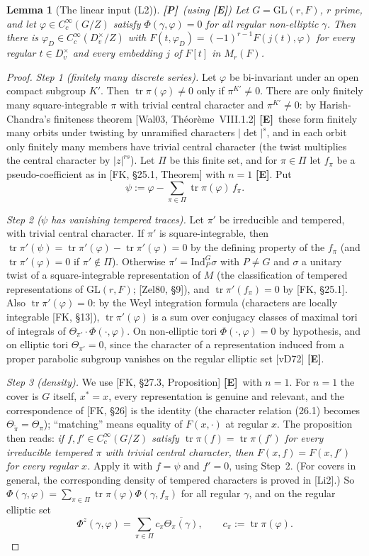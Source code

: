 \documentclass[12pt]{article}
\newcommand{\ov}[1]{\overline{#1}}
\newcommand{\tr}{\operatorname{tr}}
\newcommand{\GL}{\mathrm{GL}}
\newcommand{\Pv}{\textbf{[P]}}
\newcommand{\Ev}{\textbf{[E]}}
\theoremstyle{plain}
\newtheorem{lemma}[theorem]{Lemma}
\theoremstyle{definition}
\begin{document}
\begin{lemma}[The linear input (L2)]\label{lem:L2}\Pv\ (using \Ev)
Let $G=\GL(r,F)$, $r$ prime, and let $\varphi\in C_c^\infty(G/Z)$ satisfy $\Phi(\gamma,\varphi)=0$ for all regular non-elliptic $\gamma$. Then there is $\varphi_D\in C_c^\infty(D_v^\times/Z)$ with $F(t,\varphi_D)=(-1)^{r-1}F(j(t),\varphi)$ for every regular $t\in D_v^\times$ and every embedding $j$ of $F[t]$ in $M_r(F)$.
\end{lemma}
\begin{proof}
\emph{Step 1 (finitely many discrete series).} Let $\varphi$ be bi-invariant under an open compact subgroup $K'$. Then $\tr\pi(\varphi)\ne0$ only if $\pi^{K'}\ne0$. There are only finitely many square-integrable $\pi$ with trivial central character and $\pi^{K'}\ne0$: by Harish-Chandra's finiteness theorem [Wal03, Th\'eor\`eme~VIII.1.2] \Ev\ these form finitely many orbits under twisting by unramified characters $|\det|^s$, and in each orbit only finitely many members have trivial central character (the twist multiplies the central character by $|z|^{rs}$). Let $\Pi$ be this finite set, and for $\pi\in\Pi$ let $f_\pi$ be a pseudo-coefficient as in [FK, \S25.1, Theorem] with $n=1$ \Ev. Put
\[ \psi:=\varphi-\sum_{\pi\in\Pi}\tr\pi(\varphi)\,f_\pi . \]

\emph{Step 2 ($\psi$ has vanishing tempered traces).} Let $\pi'$ be irreducible and tempered, with trivial central character. If $\pi'$ is square-integrable, then $\tr\pi'(\psi)=\tr\pi'(\varphi)-\tr\pi'(\varphi)=0$ by the defining property of the $f_\pi$ (and $\tr\pi'(\varphi)=0$ if $\pi'\notin\Pi$). Otherwise $\pi'=\mathrm{Ind}_P^G\sigma$ with $P\ne G$ and $\sigma$ a unitary twist of a square-integrable representation of $M$ (the classification of tempered representations of $\GL(r,F)$; [Zel80, \S9]), and $\tr\pi'(f_\pi)=0$ by [FK, \S25.1]. Also $\tr\pi'(\varphi)=0$: by the Weyl integration formula (characters are locally integrable [FK, \S13]), $\tr\pi'(\varphi)$ is a sum over conjugacy classes of maximal tori of integrals of $\Theta_{\pi'}\cdot\Phi(\cdot,\varphi)$. On non-elliptic tori $\Phi(\cdot,\varphi)=0$ by hypothesis, and on elliptic tori $\Theta_{\pi'}=0$, since the character of a representation induced from a proper parabolic subgroup vanishes on the regular elliptic set [vD72] \Ev.

\emph{Step 3 (density).} We use [FK, \S27.3, Proposition] \Ev\ with $n=1$. For $n=1$ the cover is $G$ itself, $x^*=x$, every representation is genuine and relevant, and the correspondence of [FK, \S26] is the identity (the character relation (26.1) becomes $\Theta_{\tilde\pi}=\Theta_\pi$); ``matching'' means equality of $F(x,\cdot)$ at regular $x$. The proposition then reads: \emph{if $f,f'\in C_c^\infty(G/Z)$ satisfy $\tr\pi(f)=\tr\pi(f')$ for every irreducible tempered $\pi$ with trivial central character, then $F(x,f)=F(x,f')$ for every regular $x$.} Apply it with $f=\psi$ and $f'=0$, using Step~2. (For covers in general, the corresponding density of tempered characters is proved in [Li2].) So $\Phi(\gamma,\varphi)=\sum_{\pi\in\Pi}\tr\pi(\varphi)\Phi(\gamma,f_\pi)$ for all regular $\gamma$, and on the regular elliptic set
\[ \Phi^z(\gamma,\varphi)=\sum_{\pi\in\Pi}c_\pi\ov{\Theta_\pi(\gamma)},\qquad c_\pi:=\tr\pi(\varphi). \]


\end{proof}
\end{document}
